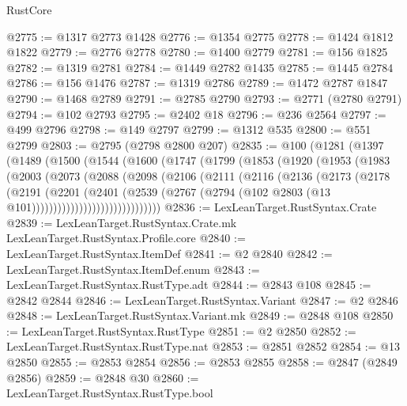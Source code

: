 \begin{lexlean}{RustCore}
\begin{coremodule}
@2775 := @1317 @2773 @1428
@2776 := @1354 @2775
@2778 := @1424 @1812 @1822
@2779 := @2776 @2778
@2780 := @1400 @2779
@2781 := @156 @1825
@2782 := @1319 @2781
@2784 := @1449 @2782 @1435
@2785 := @1445 @2784
@2786 := @156 @1476
@2787 := @1319 @2786
@2789 := @1472 @2787 @1847
@2790 := @1468 @2789
@2791 := @2785 @2790
@2793 := @2771 (@2780 @2791)
@2794 := @102 @2793
@2795 := @2402 @18
@2796 := @236 @2564
@2797 := @499 @2796
@2798 := @149 @2797
@2799 := @1312 @535
@2800 := @551 @2799
@2803 := @2795 (@2798 @2800 @207)
@2835 := @100
    (@1281
      (@1397
        (@1489
          (@1500
            (@1544
              (@1600
                (@1747
                  (@1799
                    (@1853
                      (@1920
                        (@1953
                          (@1983
                            (@2003
                              (@2073
                                (@2088
                                  (@2098
                                    (@2106
                                      (@2111
                                        (@2116
                                          (@2136
                                            (@2173
                                              (@2178
                                                (@2191
                                                  (@2201
                                                    (@2401
                                                      (@2539
                                                        (@2767
                                                          (@2794
                                                            (@102
                                                              @2803
                                                              (@13
                                                                @101))))))))))))))))))))))))))))))
@2836 := LexLeanTarget.RustSyntax.Crate
@2839 := LexLeanTarget.RustSyntax.Crate.mk LexLeanTarget.RustSyntax.Profile.core
@2840 := LexLeanTarget.RustSyntax.ItemDef
@2841 := @2 @2840
@2842 := LexLeanTarget.RustSyntax.ItemDef.enum
@2843 := LexLeanTarget.RustSyntax.RustType.adt
@2844 := @2843 @108
@2845 := @2842 @2844
@2846 := LexLeanTarget.RustSyntax.Variant
@2847 := @2 @2846
@2848 := LexLeanTarget.RustSyntax.Variant.mk
@2849 := @2848 @108
@2850 := LexLeanTarget.RustSyntax.RustType
@2851 := @2 @2850
@2852 := LexLeanTarget.RustSyntax.RustType.nat
@2853 := @2851 @2852
@2854 := @13 @2850
@2855 := @2853 @2854
@2856 := @2853 @2855
@2858 := @2847 (@2849 @2856)
@2859 := @2848 @30
@2860 := LexLeanTarget.RustSyntax.RustType.bool

\end{coremodule}
\end{lexlean}
